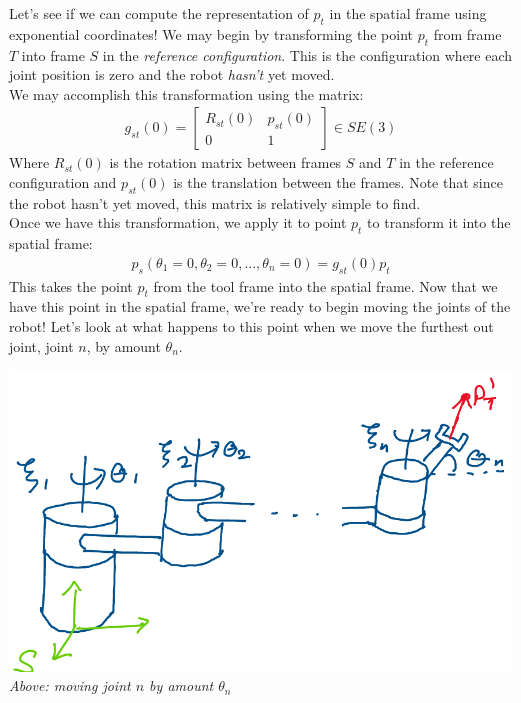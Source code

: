 \documentclass[oneside]{book}
\begin{document}
Let's see if we can compute the representation of $p_t$ in the spatial frame using exponential coordinates! We may begin by transforming the point $p_t$ from frame $T$ into frame $S$ in the \textit{reference configuration}. This is the configuration where each joint position is zero and the robot \textit{hasn't} yet moved.\\
We may accomplish this transformation using the matrix:
\begin{align}
    g_{st}(0) = 
    \begin{bmatrix}
    R_{st}(0) & p_{st}(0)\\
    0 & 1
    \end{bmatrix} \in SE(3)
\end{align}
Where $R_{st}(0)$ is the rotation matrix between frames $S$ and $T$ in the reference configuration and $p_{st}(0)$ is the translation between the frames. Note that since the robot hasn't yet moved, this matrix is relatively simple to find.\\
Once we have this transformation, we apply it to point $p_t$ to transform it into the spatial frame:
\begin{align}
    p_s(\theta_1 = 0, \theta_2 = 0, ..., \theta_n = 0) = g_{st}(0)p_t
\end{align}
This takes the point $p_t$ from the tool frame into the spatial frame. Now that we have this point in the spatial frame, we're ready to begin moving the joints of the robot! Let's look at what happens to this point when we move the furthest out joint, joint $n$, by amount $\theta_n$.
\begin{center}
    \includegraphics[scale=0.3]{images/firstTransf.png}\\
    \textit{Above: moving joint $n$ by amount $\theta_n$}
\end{center}
\end{document}
